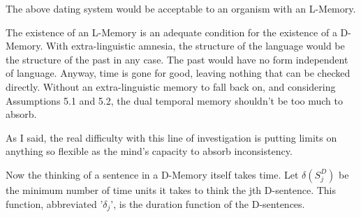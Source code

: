 \begin{hangers}
 The above dating system would be acceptable to an 
organism with an L-Memory. 

 The existence of an L-Memory is an adequate condition 
for the existence of a D-Memory. With extra-linguistic amnesia, the 
structure of the language would be the structure of the past in any case. The 
past would have no form independent of language. Anyway, time is gone for 
good, leaving nothing that can be checked directly. Without an 
extra-linguistic memory to fall back on, and considering Assumptions 5.1 
and 5.2, the dual temporal memory shouldn't be too much to absorb. 
\end{hangers}

As I said, the real difficulty with this line of investigation is putting 
limits on anything so flexible as the mind's capacity to absorb inconsistency. 

Now the thinking of a sentence in a D-Memory itself takes time. Let 
$\delta(S^D_j)$ be the minimum number of time units it takes to think the jth 
D-sentence. This function, abbreviated '$\delta_j$', is the duration function of the 
D-sentences. 

